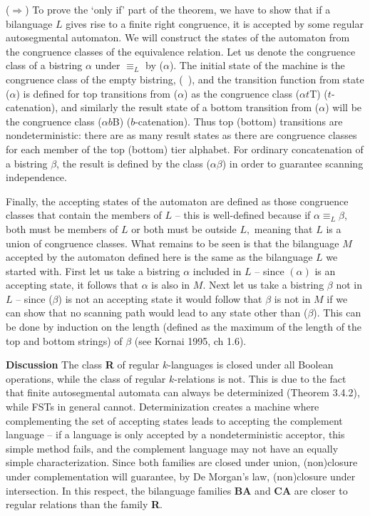 \bigskip

($\Rightarrow$) To prove the `only if' part of the theorem, we have to show
that if a bilanguage $L$ gives rise to a finite right congruence, it is
accepted by some regular autosegmental automaton. We will construct the states
of the automaton from the congruence classes of the equivalence relation. Let
us denote the congruence class of a bistring $\alpha$ under $\equiv_L$ by
($\alpha$). The initial state of the machine is the congruence class of the
empty bistring, (\ ), and the transition function from state ($\alpha$) is
defined for top transitions from ($\alpha$) as the congruence class ($\alpha
t$T) ($t$-catenation), and similarly the result state of a bottom transition
from ($\alpha$) will be the congruence class ($\alpha b$B)
($b$-catenation). Thus top (bottom) transitions are nondeterministic: there
are as many result states as there are congruence classes for each member of
the top (bottom) tier alphabet.  For ordinary concatenation of a bistring
$\beta$, the result is defined by the class ($\alpha\beta$) in order to
guarantee scanning independence.

Finally, the accepting states of the automaton are defined as those congruence
classes that contain the members of $L$ -- this is well-defined because if
$\alpha \equiv_L \beta$, both must be members of $L$ or both must be outside
$L,$ meaning that $L$ is a union of congruence classes. What remains to be
seen is that the bilanguage $M$ accepted by the automaton defined here is the
same as the bilanguage $L$ we started with. First let us take a bistring
$\alpha$ included in $L$ -- since $(\alpha)$ is an accepting state, it follows
that $\alpha$ is also in $M$. Next let us take a bistring $\beta$ not in $L$
-- since ($\beta$) is not an accepting state it would follow that $\beta$ is
not in $M$ if we can show that no scanning path would lead to any state other
than ($\beta$). This can be done by induction on the length (defined as the
maximum of the length of the top and bottom strings) of $\beta$ (see Kornai
1995, ch 1.6).

\smallskip\noindent
{\bf Discussion} The class {\bf R} of regular $k$-languages is closed under
all Boolean operations, while the class of regular $k$-relations is not. This
is due to the fact that finite autosegmental automata can always be
determinized (Theorem 3.4.2), while FSTs in general cannot. Determinization
creates a machine where complementing the set of accepting states leads to
accepting the complement language -- if a language is only accepted by a
nondeterministic acceptor, this simple method fails, and the complement
language may not have an equally simple characterization. Since both families
are closed under union, (non)closure under complementation will guarantee, by
De Morgan's law, (non)closure under intersection. In this respect, the
bilanguage families {\bf BA} and {\bf CA} are closer to regular relations than
the family {\bf R}.  


